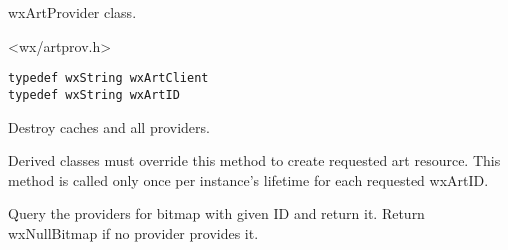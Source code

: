 %
%

\section{}\label{wxartprovider}

wxArtProvider class.




<wx/artprov.h>


{\small
\begin{verbatim}
typedef wxString wxArtClient
typedef wxString wxArtID
\end{verbatim}
}


\label{wxartprovidercleanupproviders}


Destroy caches and all providers.

\label{wxartprovidercreatebitmap}


Derived classes must override this method to create requested 
art resource. This method is called only once per instance's
lifetime for each requested wxArtID.

\label{wxartprovidergetbitmap}


Query the providers for bitmap with given ID and return it. Return
wxNullBitmap if no provider provides it.

\label{wxartprovidergeticon}


